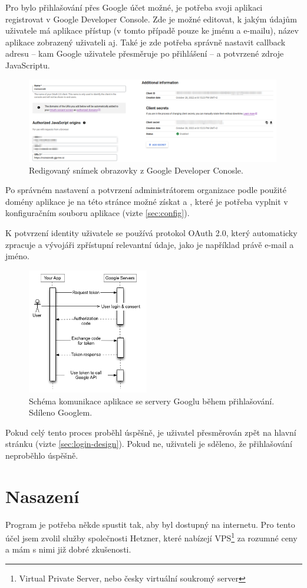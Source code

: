 Pro bylo přihlašování přes Google účet možné, je potřeba svoji aplikaci registrovat v Google Developer Console. Zde je možné editovat, k jakým údajům uživatele má aplikace přístup (v tomto případě pouze ke jménu a e-mailu), název aplikace zobrazený uživateli aj. Také je zde potřeba správně nastavit callback adresu -- kam Google uživatele přesměruje po přihlášení -- a potvrzené zdroje JavaScriptu.

\begin{figure}[H]
    \centering
    \includegraphics[width=420px]{images/02technologie/google-console.png}
    \caption{Redigovaný snímek obrazovky z Google Developer Conosle.}
\end{figure}

Po správném nastavení a potvrzení administrátorem organizace podle použité domény aplikace je na této stránce možné získat  a , které je potřeba vyplnit v konfiguračním souboru aplikace (vizte \ref{sec:config}).

K potvrzení identity uživatele se používá protokol OAuth 2.0, který  automaticky zpracuje a vývojáři zpřístupní relevantní údaje, jako je například právě e-mail a jméno.

\begin{figure}[H]
    \centering
    \includegraphics[width=200px]{images/02technologie/google-auth.png}
    \caption{Schéma komunikace aplikace se servery Googlu během přihlašování. Sdíleno Googlem. \cite{google-auth}}
\end{figure}

Pokud celý tento proces proběhl úspěšně, je uživatel přesměrován zpět na hlavní stránku (vizte \ref{sec:login-design}). Pokud ne, uživateli je sděleno, že přihlašování neproběhlo úspěšně.

\section{Nasazení}

Program je potřeba někde spustit tak, aby byl dostupný na internetu. Pro tento účel jsem zvolil služby společnosti Hetzner, které nabízejí VPS\footnote{Virtual Private Server, nebo česky virtuální soukromý server} za rozumné ceny a mám s nimi již dobré zkušenosti. 